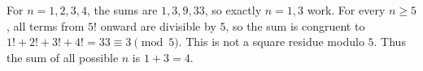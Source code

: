 For $n=1,2,3,4$, the sums are $1,3,9,33$, so exactly $n=1,3$ work. For every $n\ge5$, all terms from $5!$ onward are divisible by $5$, so the sum is congruent to $1!+2!+3!+4!=33\equiv3\pmod5$. This is not a square residue modulo $5$. Thus the sum of all possible $n$ is $\boxed{1+3=4}$.
